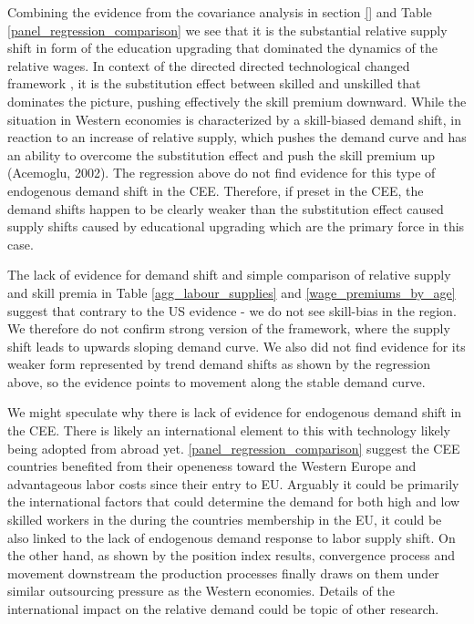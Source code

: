 \documentclass[11pt]{article}
\begin{document}
Combining the evidence from the covariance analysis in section \ref{} and Table \ref{panel_regression_comparison} we see that  it is the substantial relative supply shift in form of the education upgrading that dominated the dynamics of the relative wages. In context of the directed directed technological changed framework \citep{acemoglu2002directed}, it is the substitution effect between skilled and unskilled that dominates the picture, pushing effectively the skill premium downward. While the situation in Western economies is characterized by a skill-biased demand shift, in reaction to an increase of relative supply, which pushes the demand curve and has an ability to overcome the substitution effect and push the skill premium up (Acemoglu, 2002). The regression above do not find evidence for this type of endogenous demand shift in the CEE. Therefore, if preset in the CEE,  the demand shifts happen to be clearly weaker than the substitution effect caused supply shifts caused by educational upgrading which are the primary force in this case. 


The lack of evidence for demand shift and simple comparison of relative supply and skill premia in Table \ref{agg_labour_supplies} and \ref{wage_premiums_by_age} suggest that contrary to the US evidence - we do not see skill-bias in the region. We therefore do not confirm strong version of the \cite{acemoglu2002directed} framework, where the supply shift leads to upwards sloping demand curve. We also did not find evidence for its weaker form represented by trend demand shifts as shown by the regression above, so the evidence points to movement along the stable demand curve.

We might speculate why there is lack of evidence for endogenous demand shift in the CEE. There is likely an international element to this with technology likely being adopted from abroad yet. 
\ref{panel_regression_comparison} suggest the CEE countries benefited from their openeness toward the Western Europe and advantageous labor costs since their entry to EU. Arguably it could be primarily the international factors that could determine the demand for both high and low skilled workers in the during the countries membership in the EU, it could be also linked to the lack of endogenous demand response to labor supply shift. On the other hand, as shown by the position index results, convergence process and movement downstream the production processes finally draws on them under similar outsourcing pressure as the Western economies.  Details of the international impact on the relative demand could be topic of other research.
\end{document}
